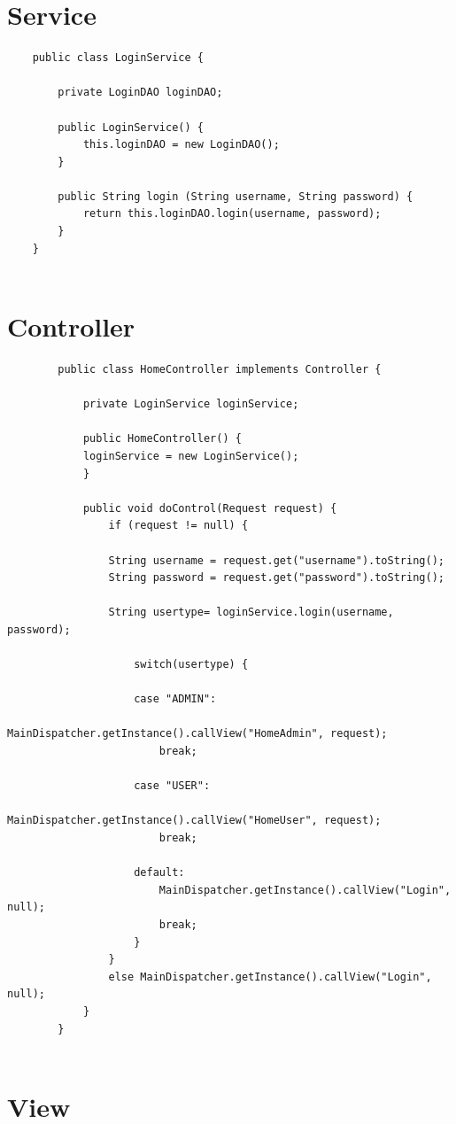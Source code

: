 \documentclass[a4paper,12 pt]{article}
\begin{document}
	\section{Service}
	
	\begin{lstlisting}
	public class LoginService {
	
		private LoginDAO loginDAO;

		public LoginService() {
			this.loginDAO = new LoginDAO();
		}
	
		public String login (String username, String password) {
			return this.loginDAO.login(username, password);
		}
	}
	
	\end{lstlisting}
	
	\section{Controller}
	
	\begin{lstlisting}
		public class HomeController implements Controller {
		
			private LoginService loginService;
	
			public HomeController() {
			loginService = new LoginService();
			}
			
			public void doControl(Request request) {
				if (request != null) {
			
				String username = request.get("username").toString();
				String password = request.get("password").toString();
				
				String usertype= loginService.login(username, password);
				
					switch(usertype) {
				
					case "ADMIN":
						MainDispatcher.getInstance().callView("HomeAdmin", request);
						break;
				
					case "USER": 
						MainDispatcher.getInstance().callView("HomeUser", request);
						break;
				
					default:
						MainDispatcher.getInstance().callView("Login", null);
						break;
					}
				}
				else MainDispatcher.getInstance().callView("Login", null);
			}
		}
	
	\end{lstlisting}
	\section{View}
	
\end{document}
